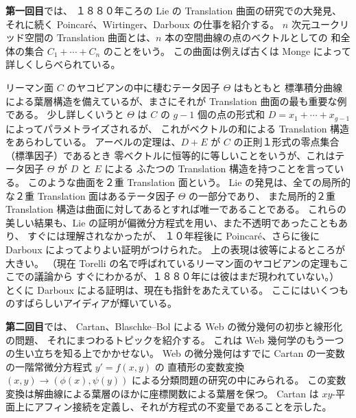 \documentclass[uplatex,dvipdfmx]{jlreq}
\begin{document}
\bigskip

\noindent\textbf{第一回目}では、
１８８０年ころの Lie の Translation 曲面の研究での大発見、
それに続く Poincaré、Wirtinger、Darboux の仕事を紹介する。
$n$ 次元ユークリッド空間の Translation 曲面とは、$n$ 本の空間曲線の点のベクトルとしての
和全体の集合 $C_1 + \cdots + C_n$ のことをいう。
この曲面は例えば古くは Monge によって詳しくしらべられている。

リーマン面 $C$ のヤコビアンの中に棲むテータ因子 $\Theta$ はもともと
標準積分曲線による葉層構造を備えているが、まさにそれが Translation 曲面の最も重要な例である。
少し詳しくいうと $\Theta$ は $C$ の $g-1$ 個の点の形式和
$D = x_1 + \cdots + x_{g-1}$ によってパラメトライズされるが、
これがベクトルの和による Translation 構造をあらわしている。
アーベルの定理は、$D + E$ が $C$ の正則１形式の零点集合（標準因子）であるとき
零ベクトルに恒等的に等しいことをいうが、これはテータ因子 $\Theta$ が $D$ と $E$ による
ふたつの Translation 構造を持つことを言っている。
このような曲面を２重 Translation 面という。
Lie の発見は、全ての局所的な２重 Translation 面はあるテータ因子 $\Theta$ の一部分であり、
また局所的２重 Translation 構造は曲面に対してあるとすれば唯一であることである。
これらの美しい結果も、Lie の証明が偏微分方程式を用い、また不透明であったこともあり、
すぐには理解されなかったが、
１０年程後に Poincaré、さらに後に Darboux によってよりよい証明がつけられた。
上の表現は彼等によるところが大きい。
（現在 Torelli の名で呼ばれているリーマン面のヤコビアンの定理もここでの議論から
すぐにわかるが、１８８０年には彼はまだ現われていない。）
とくに Darboux による証明は、現在も指針をあたえている。
ここにはいくつものすばらしいアイディアが輝いている。

\bigskip

\noindent\textbf{第二回目}では、
Cartan、Blaschke--Bol による Web の微分幾何の初歩と線形化の問題、
それにまつわるトピックを紹介する。
これは Web 幾何学のもう一つの生い立ちを知る上でかかせない。
Web の微分幾何はすでに Cartan の一変数の一階常微分方程式 $y' = f(x,y)$ の
直積形の変数変換 $(x,y) \to (\phi(x), \psi(y))$ による分類問題の研究の中にみられる。
この変数変換は解曲線による葉層のほかに座標関数による葉層を保つ。
Cartan は $xy$-平面上にアフィン接続を定義し、それが方程式の不変量であることを示した。
\end{document}

